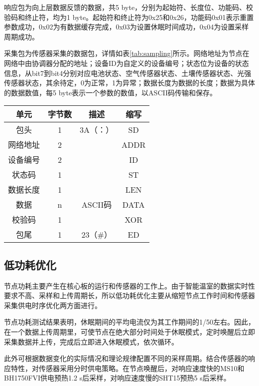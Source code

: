 响应包为向上层数据反馈的数据，共5 byte，分别为起始符、长度位、功能码、校验码和终止符，均为1 byte。起始符和终止符为0x25和0x26，功能码0x01表示重置参数成功，0x02为有数据缓存完成，0x03为设置休眠时间成功，0x04为设置采样周期成功。

采集包为传感器采集的数据包，详情如表\ref{tab:sampling}所示。网络地址为节点在网络中由协调器分配的地址；设备ID为自定义的设备编号；状态位为设备的状态信息，从bit7到bit4分别对应电池状态、空气传感器状态、土壤传感器状态、光强传感器状态，其余待定，0为正常，1为异常；数据长度为数据的长度；数据为具体的数据数值，每5 byte表示一个参数的数值，以ASCII码传输和保存。

		\begin{table}[!htbp]
  			\centering
  			\begin{tabular}{cccc} \toprule
			单元 & 	字节数 & 	描述 & 	缩写\\ \midrule
			包头 & 	1 & 	3A（：）	 & SD\\
			网络地址 & 	2 & 	 & 	ADDR\\
			设备编号 & 	2 & 	 & 	ID\\
			状态码	 & 1	 & &  	ST\\
			数据长度	 & 1	 &  & 	LEN\\
			数据 & 	n & 	ASCII码 & 	DATA\\
			校验码	& 1	 &  & 	XOR\\
			包尾	& 1	 & 23（\#） & 	ED\\ \bottomrule
 			\end{tabular}
		\end{table}
		
	\subsection{低功耗优化}
	节点功耗主要产生在核心板的运行和传感器的工作上。由于智能温室的数据实时性要求不高、采样和上传周期长，所以低功耗优化主要从缩短节点工作时间和传感器采集供电时序优化两方面进行。
	
节点功耗测试结果表明，休眠期间的平均电流仅为其工作期间的1/50左右。因此，在一个数据上传周期里，可使节点在绝大部分时间处于休眠模式，定时唤醒后立即采集数据并上传，完成后立即进入休眠模式，依次循环。

此外可根据数据变化的实际情况和理论规律配置不同的采样周期。结合传感器的响应特性，对传感器采用分时供电策略。在节点唤醒后，对响应速度快的MS10和BH1750FVI供电预热1.2 s后采样，对响应速度慢的SHT15预热5 s后采样。

